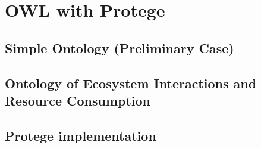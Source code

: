 \documentclass[12pt]{article}
\begin{document}
\tableofcontents

\newpage

\section{OWL with Protege}
\subsection{Simple Ontology (Preliminary Case)}


\subsection{Ontology of Ecosystem Interactions and Resource Consumption}


\subsection{Protege implementation}

\end{document}
